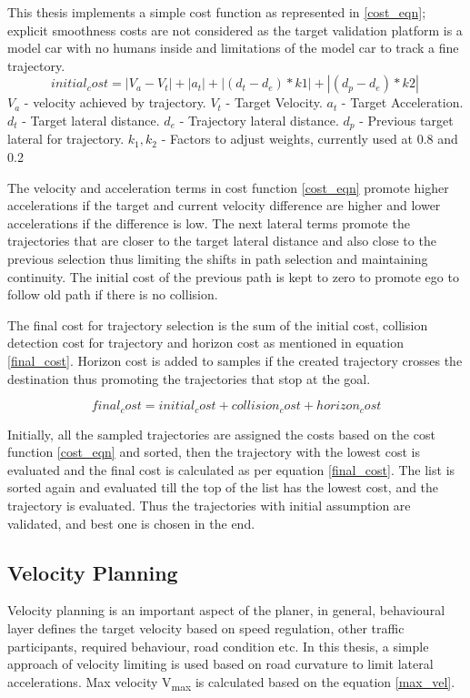 This thesis implements a simple cost function as represented in \ref{cost_eqn}; explicit smoothness costs are not considered as the target validation platform is a model car with no humans inside and limitations of the model car to track a fine trajectory. 
\begin{equation}
initial_cost = |V_a - V_t| + |a_t| + | (d_t - d_e)*k1 | + | (d_p - d_e)*k2 |\
\label{cost_eqn}
\end{equation}
$V_a$ - velocity achieved by trajectory.
$V_t$ - Target Velocity.
$a_t$ - Target Acceleration.
$d_t$ - Target lateral distance.
$d_e$ - Trajectory lateral distance.
$d_p$ - Previous target lateral for trajectory.
$k_1,k_2$ - Factors to adjust weights, currently used at 0.8 and 0.2

The velocity and acceleration terms in cost function \ref{cost_eqn} promote higher accelerations if the target and current velocity difference are higher and lower accelerations if the difference is low. The next lateral terms promote the trajectories that are closer to the target lateral distance and also close to the previous selection thus limiting the shifts in path selection and maintaining continuity. The initial cost of the previous path is kept to zero to promote ego to follow old path if there is no collision. 

The final cost for trajectory selection is the sum of the initial cost, collision detection cost for trajectory and horizon cost as mentioned in equation \ref{final_cost}. Horizon cost is added to samples if the created trajectory crosses the destination thus promoting the trajectories that stop at the goal. 

\begin{equation}
final_cost = initial_cost + collision_cost + horizon_cost
\label{final_cost}
\end{equation}

Initially, all the sampled trajectories are assigned the costs based on the cost function \ref{cost_eqn} and sorted, then the trajectory with the lowest cost is evaluated and the final cost is calculated as per equation \ref{final_cost}. The list is sorted again and evaluated till the top of the list has the lowest cost, and the trajectory is evaluated. Thus the trajectories with initial assumption are validated, and best one is chosen in the end. 

\subsection{Velocity Planning}
Velocity planning is an important aspect of the planer, in general, behavioural layer defines the target velocity based on speed regulation, other traffic participants, required behaviour, road condition etc. In this thesis, a simple approach of velocity limiting is used based on road curvature to limit lateral accelerations. Max velocity  V\textsubscript{max} is calculated based on the equation \ref{max_vel}. 

